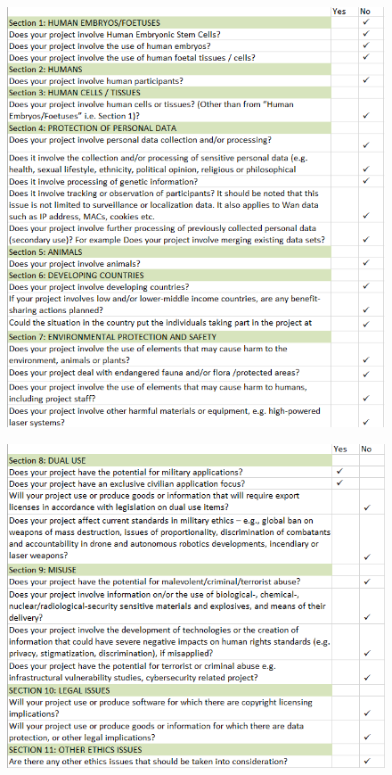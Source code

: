 \begin{figure}[H]
\begin{center}
\includegraphics[width=\textwidth]{Chapter8_Ethics/ethhics_p1.png}
\label{fig:ethics_p1}
\end{center}
\end{figure}

\newpage

\begin{figure}[H]
\begin{center}
\includegraphics[width=\textwidth]{Chapter8_Ethics/ethhics_p2.png}
\label{fig:ethics_p2}
\end{center}
\end{figure}